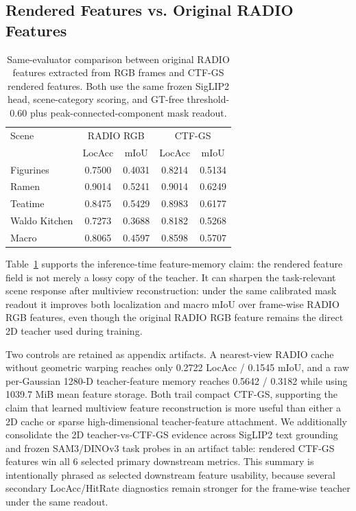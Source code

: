 \documentclass[10pt,twocolumn,letterpaper]{article}
\newcommand{\method}{CTF-GS}
\begin{document}
\subsection{Rendered Features vs. Original RADIO Features}

\begin{table}[t]
\centering
\caption{Same-evaluator comparison between original RADIO features extracted
from RGB frames and \method{} rendered features. Both use the same frozen
SigLIP2 head, scene-category scoring, and GT-free threshold-0.60 plus
peak-connected-component mask readout.}
\label{tab:teacher_vs_rendered}
\begin{tabular}{lcccc}
\toprule
Scene & \multicolumn{2}{c}{RADIO RGB} & \multicolumn{2}{c}{\method{}} \\
 & LocAcc & mIoU & LocAcc & mIoU \\
\midrule
Figurines & 0.7500 & 0.4031 & 0.8214 & 0.5134 \\
Ramen & 0.9014 & 0.5241 & 0.9014 & 0.6249 \\
Teatime & 0.8475 & 0.5429 & 0.8983 & 0.6177 \\
Waldo Kitchen & 0.7273 & 0.3688 & 0.8182 & 0.5268 \\
\midrule
Macro & 0.8065 & 0.4597 & 0.8598 & 0.5707 \\
\bottomrule
\end{tabular}
\end{table}

Table~\ref{tab:teacher_vs_rendered} supports the inference-time feature-memory
claim: the rendered feature field is not merely a lossy copy of the teacher. It
can sharpen the task-relevant scene response after multiview reconstruction:
under the same calibrated mask readout it improves both localization and macro
mIoU over frame-wise RADIO RGB features, even though the original RADIO RGB
feature remains the direct 2D teacher used during training.

Two controls are retained as appendix artifacts. A nearest-view RADIO cache
without geometric warping reaches only 0.2722 LocAcc / 0.1545 mIoU, and a raw
per-Gaussian 1280-D teacher-feature memory reaches 0.5642 / 0.3182 while using
1039.7 MiB mean feature storage. Both trail compact \method{}, supporting the
claim that learned multiview feature reconstruction is more useful than either
a 2D cache or sparse high-dimensional teacher-feature attachment.
We additionally consolidate the 2D teacher-vs-\method{} evidence across
SigLIP2 text grounding and frozen SAM3/DINOv3 task probes in an artifact table:
rendered \method{} features win all 6 selected primary downstream metrics.
This summary is intentionally phrased as selected downstream feature usability,
because several secondary LocAcc/HitRate diagnostics remain stronger for the
frame-wise teacher under the same readout.
\end{document}
